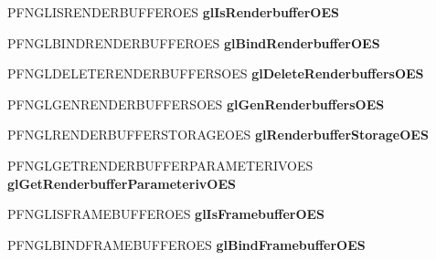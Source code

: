 \begin{DoxyCompactItemize}
\item 
\hypertarget{class_c_p_v_r_tgles_ext_aa90e166055b68bd3df4cb8f34c49d9b4}{P\+F\+N\+G\+L\+I\+S\+R\+E\+N\+D\+E\+R\+B\+U\+F\+F\+E\+R\+O\+E\+S {\bfseries gl\+Is\+Renderbuffer\+O\+E\+S}}\label{class_c_p_v_r_tgles_ext_aa90e166055b68bd3df4cb8f34c49d9b4}

\item 
\hypertarget{class_c_p_v_r_tgles_ext_abf2c2d9cabba0f5df0bc8d317c7ab5f4}{P\+F\+N\+G\+L\+B\+I\+N\+D\+R\+E\+N\+D\+E\+R\+B\+U\+F\+F\+E\+R\+O\+E\+S {\bfseries gl\+Bind\+Renderbuffer\+O\+E\+S}}\label{class_c_p_v_r_tgles_ext_abf2c2d9cabba0f5df0bc8d317c7ab5f4}

\item 
\hypertarget{class_c_p_v_r_tgles_ext_a59b4bb6484814eefc5561f50b7808f62}{P\+F\+N\+G\+L\+D\+E\+L\+E\+T\+E\+R\+E\+N\+D\+E\+R\+B\+U\+F\+F\+E\+R\+S\+O\+E\+S {\bfseries gl\+Delete\+Renderbuffers\+O\+E\+S}}\label{class_c_p_v_r_tgles_ext_a59b4bb6484814eefc5561f50b7808f62}

\item 
\hypertarget{class_c_p_v_r_tgles_ext_ae257e9d38ddf26e28df25f3da6bb32e2}{P\+F\+N\+G\+L\+G\+E\+N\+R\+E\+N\+D\+E\+R\+B\+U\+F\+F\+E\+R\+S\+O\+E\+S {\bfseries gl\+Gen\+Renderbuffers\+O\+E\+S}}\label{class_c_p_v_r_tgles_ext_ae257e9d38ddf26e28df25f3da6bb32e2}

\item 
\hypertarget{class_c_p_v_r_tgles_ext_a736b890c4bec12599bd9dd2d4ad11ea0}{P\+F\+N\+G\+L\+R\+E\+N\+D\+E\+R\+B\+U\+F\+F\+E\+R\+S\+T\+O\+R\+A\+G\+E\+O\+E\+S {\bfseries gl\+Renderbuffer\+Storage\+O\+E\+S}}\label{class_c_p_v_r_tgles_ext_a736b890c4bec12599bd9dd2d4ad11ea0}

\item 
\hypertarget{class_c_p_v_r_tgles_ext_a9ce38075dc494ddcd6de1a33fbfceaaf}{P\+F\+N\+G\+L\+G\+E\+T\+R\+E\+N\+D\+E\+R\+B\+U\+F\+F\+E\+R\+P\+A\+R\+A\+M\+E\+T\+E\+R\+I\+V\+O\+E\+S {\bfseries gl\+Get\+Renderbuffer\+Parameteriv\+O\+E\+S}}\label{class_c_p_v_r_tgles_ext_a9ce38075dc494ddcd6de1a33fbfceaaf}

\item 
\hypertarget{class_c_p_v_r_tgles_ext_a895cd89026e77dffef71b1d16cbe0894}{P\+F\+N\+G\+L\+I\+S\+F\+R\+A\+M\+E\+B\+U\+F\+F\+E\+R\+O\+E\+S {\bfseries gl\+Is\+Framebuffer\+O\+E\+S}}\label{class_c_p_v_r_tgles_ext_a895cd89026e77dffef71b1d16cbe0894}

\item 
\hypertarget{class_c_p_v_r_tgles_ext_a691dda36835b5428bc9df344563547f7}{P\+F\+N\+G\+L\+B\+I\+N\+D\+F\+R\+A\+M\+E\+B\+U\+F\+F\+E\+R\+O\+E\+S {\bfseries gl\+Bind\+Framebuffer\+O\+E\+S}}\label{class_c_p_v_r_tgles_ext_a691dda36835b5428bc9df344563547f7}


\end{DoxyCompactItemize}
